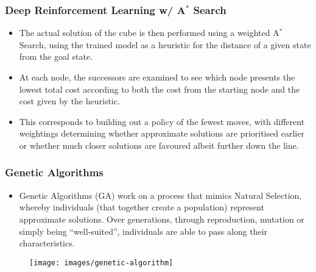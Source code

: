 \documentclass[UKenglish]{beamer}
\begin{document}
\begin{frame}
\frametitle{Deep Reinforcement Learning w/ A$^\ast$ Search}
\begin{itemize}
    \item The actual solution of the cube is then performed using a weighted A$^\ast$ Search, using the trained model as a heuristic for the distance of a given state from the goal state.
    \item At each node, the successors are examined to see which node presents the lowest total cost according to both the cost from the starting node and the cost given by the heuristic.
    \item This corresponds to building out a policy of the fewest moves, with different weightings determining whether approximate solutions are prioritised earlier or whether much closer solutions are favoured albeit further down the line.
\end{itemize}
\end{frame}

\begin{frame}
\frametitle{Genetic Algorithms}
\begin{itemize}
    \item Genetic Algorithms (GA) work on a process that mimics Natural Selection, whereby individuals (that together create a population) represent approximate solutions. Over generations, through reproduction, mutation or simply being ``well-suited'', individuals are able to pass along their characteristics.
\end{itemize}

\begin{figure}[!h]
\begin{small}
\centering
\linespread{1.0}
\texttt{[image: images/genetic-algorithm]}
\label{fig:fig11}
\end{small}
\end{figure}

\end{frame}
\end{document}
